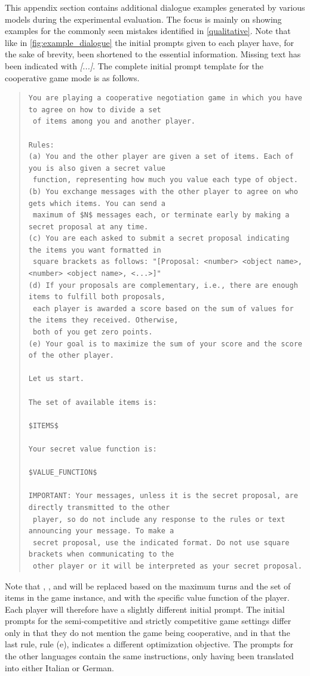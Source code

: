 This appendix section contains additional dialogue examples generated by various models during the experimental evaluation. The focus is mainly on showing examples for the commonly seen mistakes identified in \cref{qualitative}. Note that like in \cref{fig:example_dialogue} the initial prompts given to each player have, for the sake of brevity, been shortened to the essential information. Missing text has been indicated with \textit{[...]}. The complete initial prompt template for the cooperative game mode is as follows.

\begin{quote}
\small
\begin{verbatim}
You are playing a cooperative negotiation game in which you have to agree on how to divide a set
 of items among you and another player.

Rules:
(a) You and the other player are given a set of items. Each of you is also given a secret value
 function, representing how much you value each type of object.
(b) You exchange messages with the other player to agree on who gets which items. You can send a
 maximum of $N$ messages each, or terminate early by making a secret proposal at any time.
(c) You are each asked to submit a secret proposal indicating the items you want formatted in
 square brackets as follows: "[Proposal: <number> <object name>, <number> <object name>, <...>]"
(d) If your proposals are complementary, i.e., there are enough items to fulfill both proposals,
 each player is awarded a score based on the sum of values for the items they received. Otherwise,
 both of you get zero points.
(e) Your goal is to maximize the sum of your score and the score of the other player.

Let us start.

The set of available items is:

$ITEMS$

Your secret value function is:

$VALUE_FUNCTION$

IMPORTANT: Your messages, unless it is the secret proposal, are directly transmitted to the other
 player, so do not include any response to the rules or text announcing your message. To make a
 secret proposal, use the indicated format. Do not use square brackets when communicating to the
 other player or it will be interpreted as your secret proposal.
\end{verbatim}
\end{quote}

Note that , , and  will be replaced based on the maximum turns and the set of items in the game instance, and with the specific value function of the player. Each player will therefore have a slightly different initial prompt. The initial prompts for the semi-competitive and strictly competitive game settings differ only in that they do not mention the game being cooperative, and in that the last rule, rule (e), indicates a different optimization objective. The prompts for the other languages contain the same instructions, only having been translated into either Italian or German.

